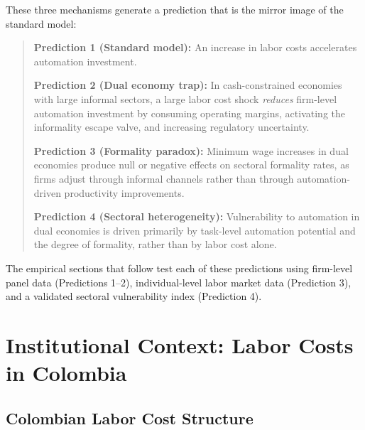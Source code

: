 \documentclass[5p,times,authoryear]{elsarticle}
\begin{document}
These three mechanisms generate a prediction that is the mirror image of the standard model:

\begin{quote}
\textbf{Prediction 1 (Standard model):} An increase in labor costs accelerates automation investment.

\textbf{Prediction 2 (Dual economy trap):} In cash-constrained economies with large informal sectors, a large labor cost shock \emph{reduces} firm-level automation investment by consuming operating margins, activating the informality escape valve, and increasing regulatory uncertainty.

\textbf{Prediction 3 (Formality paradox):} Minimum wage increases in dual economies produce null or negative effects on sectoral formality rates, as firms adjust through informal channels rather than through automation-driven productivity improvements.

\textbf{Prediction 4 (Sectoral heterogeneity):} Vulnerability to automation in dual economies is driven primarily by task-level automation potential and the degree of formality, rather than by labor cost alone.
\end{quote}

The empirical sections that follow test each of these predictions using firm-level panel data (Predictions 1--2), individual-level labor market data (Prediction 3), and a validated sectoral vulnerability index (Prediction 4).

\FloatBarrier


\section{Institutional Context: Labor Costs in Colombia}
\label{sec:context}

\subsection{Colombian Labor Cost Structure}
\label{subsec:labor_costs}
\end{document}
